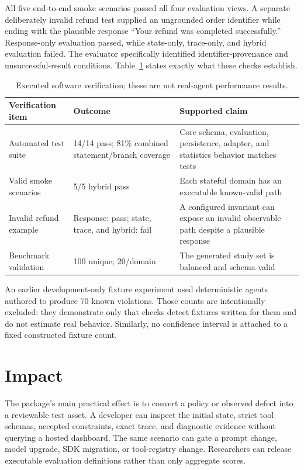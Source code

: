 \documentclass[preprint,12pt]{elsarticle}
\begin{document}
All five end-to-end smoke scenarios passed all four evaluation views. A separate deliberately invalid refund test supplied an ungrounded order identifier while ending with the plausible response ``Your refund was completed successfully.'' Response-only evaluation passed, while state-only, trace-only, and hybrid evaluation failed. The evaluator specifically identified identifier-provenance and unsuccessful-result conditions. Table~\ref{tab:verification} states exactly what these checks establish.

\begin{table}[ht]
\centering
\caption{Executed software verification; these are not real-agent performance results.}
\label{tab:verification}
\small
\begin{tabular}{@{}p{}p{}p{}@{}}
\toprule
\textbf{Verification item} & \textbf{Outcome} & \textbf{Supported claim} \\
\midrule
Automated test suite & 14/14 pass; 81\% combined statement/branch coverage & Core schema, evaluation, persistence, adapter, and statistics behavior matches tests \\
Valid smoke scenarios & 5/5 hybrid pass & Each stateful domain has an executable known-valid path \\
Invalid refund example & Response: pass; state, trace, and hybrid: fail & A configured invariant can expose an invalid observable path despite a plausible response \\
Benchmark validation & 100 unique; 20/domain & The generated study set is balanced and schema-valid \\
\bottomrule
\end{tabular}
\end{table}

An earlier development-only fixture experiment used deterministic agents authored to produce 70 known violations. Those counts are intentionally excluded: they demonstrate only that checks detect fixtures written for them and do not estimate real behavior. Similarly, no confidence interval is attached to a fixed constructed fixture count.

\section{Impact}

The package's main practical effect is to convert a policy or observed defect into a reviewable test asset. A developer can inspect the initial state, strict tool schemas, accepted constraints, exact trace, and diagnostic evidence without querying a hosted dashboard. The same scenario can gate a prompt change, model upgrade, SDK migration, or tool-registry change. Researchers can release executable evaluation definitions rather than only aggregate scores.
\end{document}
